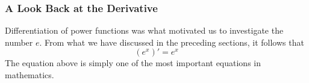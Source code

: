\subsubsection{A Look Back at the Derivative}
Differentiation of power functions was what motivated us to investigate the number $ e $. From what we have discussed in the preceding sections, it follows that
\[ \left(e^x\right)'=e^x \]
The equation above is simply one of the most important equations in\\
mathematics.

